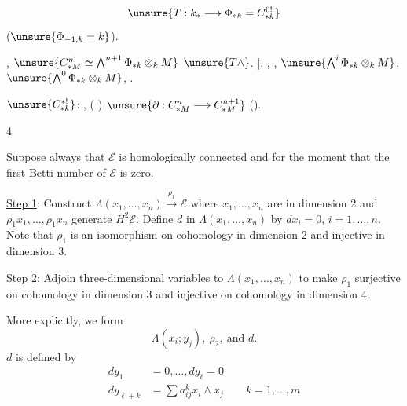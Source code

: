  
\[
\unsure{T:k_*\longrightarrow \Phi_{*k}=C_{*k}^{0!}}
\]
 
($\unsure{\Phi_{-1,k}=k}$).

  ,
$\unsure{C_{*M}^{n!}\simeq\bigwedge^{n+1}\Phi_{*k}\otimes_k M}$
  $\unsure{T\wedge}$.
   ].
   
, ,
$\unsure{\bigwedge^i \Phi_{*k}\otimes_k M}$.
 $\unsure{\bigwedge^0\Phi_{*k}\otimes_k M}$,
  .

$\unsure{C_{*k}^{*!}}$:
 ,
  (
 )
 
$\unsure{\partial:C_{*M}^n\longrightarrow C_{*M}^{n+1}}$
 ().

\begin{flushright}4\end{flushright}

Suppose always that $\mathcal E$ is homologically connected and for the moment that the first Betti number of $\mathcal E$ is zero.

\uline{Step 1}: Construct $\Lambda(x_1,\ldots,x_n)\xrightarrow{\rho_1}\mathcal E$ where $x_1,\ldots,x_n$ are in dimension 2 and $\rho_1x_1,\ldots,\rho_1x_n$ generate $H^2\mathcal E$.
Define $d$ in $\Lambda(x_1,\ldots,x_n)$ by $dx_i=0$, $i=1,\ldots,n$.
Note that $\rho_1$ is an isomorphism on cohomology in dimension 2 and injective in dimension 3.

\uline{Step 2}: Adjoin three-dimensional variables to $\Lambda(x_1,\ldots,x_n)$ to make $\rho_1$ surjective on cohomology in dimension 3 and injective on cohomology in dimension 4.

More explicitly, we form
\[
\Lambda(x_i;y_j),\ \rho_2,\ \text{and }d.
\]
$d$ is defined by
\[
\begin{aligned}
dy_1&=0,\ldots,dy_\ell=0\\
dy_{\ell+k}&=\sum a^k_{ij}x_i\wedge x_j
\qquad k=1,\ldots,m
\end{aligned}
\]

